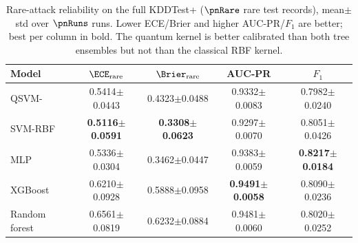 \begin{table}[t]
\centering
\caption{Rare-attack reliability on the full KDDTest+ ($\pnRare$ rare test records), mean$\pm$std over $\pnRuns$ runs. Lower ECE/Brier and higher AUC-PR/$F_1$ are better; best per column in bold. The quantum kernel is better calibrated than both tree ensembles but not than the classical RBF kernel.}
\label{tab:rare}
\begin{tabular}{lcccc}
\toprule
Model & $\ECE_{\text{rare}}$ & $\Brier_{\text{rare}}$ & AUC-PR & $F_1$ \\
\midrule
QSVM-\ZZ{} & 0.5414$\pm$0.0443 & 0.4323$\pm$0.0488 & 0.9332$\pm$0.0083 & 0.7982$\pm$0.0240 \\
SVM-RBF & \textbf{0.5116$\pm$0.0591} & \textbf{0.3308$\pm$0.0623} & 0.9297$\pm$0.0070 & 0.8051$\pm$0.0426 \\
MLP & 0.5336$\pm$0.0304 & 0.3462$\pm$0.0447 & 0.9383$\pm$0.0059 & \textbf{0.8217$\pm$0.0184} \\
XGBoost & 0.6210$\pm$0.0928 & 0.5888$\pm$0.0958 & \textbf{0.9491$\pm$0.0058} & 0.8090$\pm$0.0236 \\
Random forest & 0.6561$\pm$0.0819 & 0.6232$\pm$0.0884 & 0.9481$\pm$0.0060 & 0.8020$\pm$0.0252 \\
\bottomrule
\end{tabular}
\end{table}
